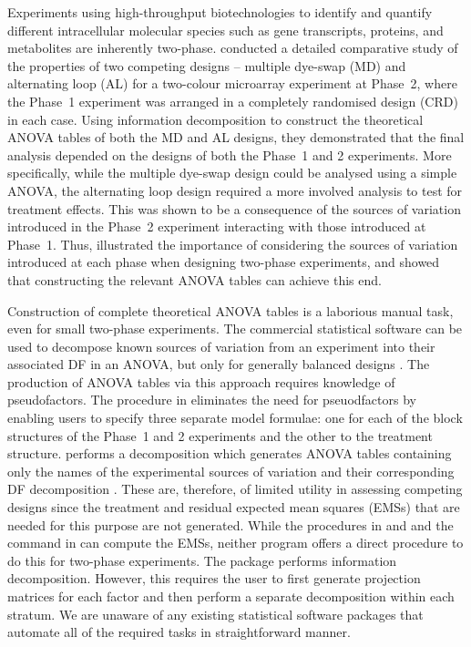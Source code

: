 \documentclass[article]{jss}
\begin{document}
Experiments using high-throughput biotechnologies to identify and quantify different intracellular molecular species such as gene transcripts, proteins, and metabolites are inherently two-phase. \cite{Jarrett2008} conducted a detailed comparative study of the properties of two competing designs -- multiple dye-swap (MD) and alternating loop (AL) \citep{Churchill2002} for a two-colour microarray experiment at Phase~2, where the Phase~1 experiment was arranged in a completely randomised design (CRD) in each case. Using information decomposition to construct the theoretical ANOVA tables of both the MD and AL designs, they demonstrated that the final analysis depended on the designs of both the Phase~1 and 2 experiments. More specifically, while the multiple dye-swap design could be analysed using a simple ANOVA, the alternating loop design required a more involved analysis to test for treatment effects. This was shown to be a consequence of the sources of variation introduced in the Phase~2 experiment interacting with those introduced at Phase~1. Thus, \cite{Jarrett2008} illustrated the importance of considering the sources of variation introduced at each phase when designing two-phase experiments, and showed that constructing the relevant ANOVA tables can achieve this end.

Construction of complete theoretical ANOVA tables is a laborious manual task, even for small two-phase experiments. The commercial statistical software  can be used to decompose known sources of variation from an experiment into their associated DF in an ANOVA, but only for generally balanced designs \citep{Payne2003}. The production of ANOVA tables via this approach requires knowledge of pseudofactors. The  procedure in  eliminates the need for pseuodfactors by enabling users to specify three separate model formulae: one for each of the block structures of the Phase~1 and 2 experiments and the other to the treatment structure.  performs a decomposition which generates ANOVA tables containing only the names of the experimental sources of variation and their corresponding DF decomposition \citep{Brien2006a}. These are, therefore, of limited utility in assessing competing designs since the treatment and residual expected mean squares (EMSs) that are needed for this purpose are not generated. While the  procedures in  and  and the  command in  can compute the EMSs, neither program offers a direct procedure to do this for two-phase experiments. The   package \cite{Brien2011a} performs information decomposition. However, this requires the user to first generate projection matrices for each factor and then perform a separate decomposition within each stratum. We are unaware of any existing statistical software packages that automate all of the required tasks in straightforward manner.
\end{document}
